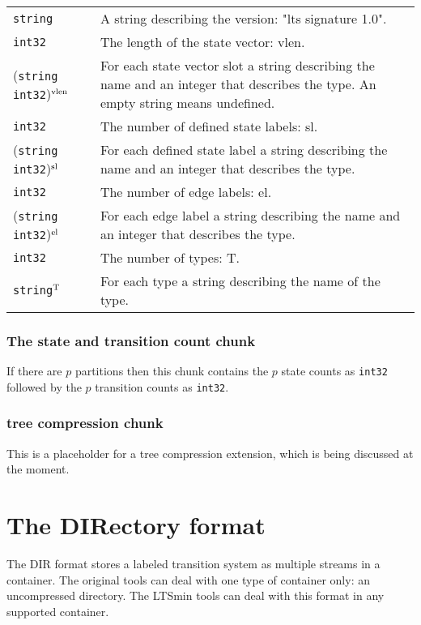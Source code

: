 \par\noindent\begin{tabularx}{\textwidth}{lX}
{\tt string} & A string describing the version: "lts signature 1.0".
\\
{\tt int32} & The length of the state vector: vlen.
\\
({\tt string} {\tt int32})${}^{\rm vlen}$ & For each state vector slot a string describing the name and an integer that describes the type.
An empty string means undefined.
\\
{\tt int32} & The number of defined state labels: sl.
\\
({\tt string} {\tt int32})${}^{\rm sl}$ & For each defined state label a string describing the name and an integer that describes the type.
\\
{\tt int32} & The number of edge labels: el.
\\
({\tt string} {\tt int32})${}^{\rm el}$ & For each edge label a string describing the name and an integer that describes the type.
\\
{\tt int32} & The number of types: T.
\\
{\tt string}${}^{\rm T}$ & For each type a string describing the name of the type.
\end{tabularx}

\subsubsection{The state and transition count chunk}

If there are $p$ partitions then this chunk contains the $p$ state counts as {\tt int32} followed by
the $p$ transition counts as {\tt int32}.

\subsubsection{tree compression chunk}

This is a placeholder for a tree compression extension, which is being discussed
at the moment.

\section{The DIRectory format}

The DIR format stores a labeled transition system as multiple streams in a container.
The original tools can deal with one type of container only: an uncompressed directory.
The LTSmin tools can deal with this format in any supported container.


